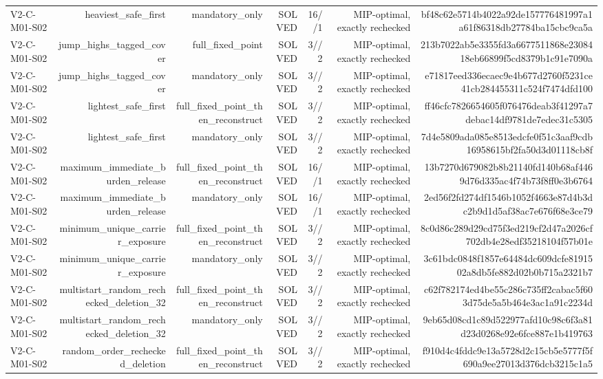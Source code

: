 {\begin{longtable}{lrrrrrr}
V2-C-M01-S02 & heaviest\_safe\_first & mandatory\_only & SOLVED & 16//1 & MIP-optimal, exactly rechecked & bf48c62e5714b4022a92de157776481997a1a61f86318db27784ba15cbc9ca5a \\
V2-C-M01-S02 & jump\_highs\_tagged\_cover & full\_fixed\_point & SOLVED & 3//2 & MIP-optimal, exactly rechecked & 213b7022ab5e3355fd3a6677511868e2308418eb66899f5cd8379b1c91e7090a \\
V2-C-M01-S02 & jump\_highs\_tagged\_cover & mandatory\_only & SOLVED & 3//2 & MIP-optimal, exactly rechecked & e71817eed336ecaec9e4b677d2760f5231ce41cb284455311c524f7474dfd100 \\
V2-C-M01-S02 & lightest\_safe\_first & full\_fixed\_point\_then\_reconstruct & SOLVED & 3//2 & MIP-optimal, exactly rechecked & ff46cfc7826654605f076476deab3f41297a7debac14df9781de7edec31c5305 \\
V2-C-M01-S02 & lightest\_safe\_first & mandatory\_only & SOLVED & 3//2 & MIP-optimal, exactly rechecked & 7d4e5809ada085e8513edcfe0f51c3aaf9cdb16958615bf2fa50d3d01118cb8f \\
V2-C-M01-S02 & maximum\_immediate\_burden\_release & full\_fixed\_point\_then\_reconstruct & SOLVED & 16//1 & MIP-optimal, exactly rechecked & 13b7270d679082b8b21140fd140b68af4469d76d335ac4f74b73f8ff0e3b6764 \\
V2-C-M01-S02 & maximum\_immediate\_burden\_release & mandatory\_only & SOLVED & 16//1 & MIP-optimal, exactly rechecked & 2ed56f2fd274df1546b1052f4663e87d4b3dc2b9d1d5af38ac7e676f68e3ce79 \\
V2-C-M01-S02 & minimum\_unique\_carrier\_exposure & full\_fixed\_point\_then\_reconstruct & SOLVED & 3//2 & MIP-optimal, exactly rechecked & 8c0d86c289d29cd75f3ed219cf2d47a2026cf702db4e28edf35218104f57b01e \\
V2-C-M01-S02 & minimum\_unique\_carrier\_exposure & mandatory\_only & SOLVED & 3//2 & MIP-optimal, exactly rechecked & 3c61bdc0848f1857e64484dc609dcfe8191502a8db5fe882d02b0b715a2321b7 \\
V2-C-M01-S02 & multistart\_random\_rechecked\_deletion\_32 & full\_fixed\_point\_then\_reconstruct & SOLVED & 3//2 & MIP-optimal, exactly rechecked & c62f782174ed4be55c286c735ff2cabac5f603d75de5a5b464e3ac1a91c2234d \\
V2-C-M01-S02 & multistart\_random\_rechecked\_deletion\_32 & mandatory\_only & SOLVED & 3//2 & MIP-optimal, exactly rechecked & 9eb65d08cd1c89d522977afd10c98c6f3a81d23d0268e92e6fce887e1b419763 \\
V2-C-M01-S02 & random\_order\_rechecked\_deletion & full\_fixed\_point\_then\_reconstruct & SOLVED & 3//2 & MIP-optimal, exactly rechecked & f910d4c4fddc9e13a5728d2c15cb5e5777f5f690a9ee27013d376dcb3215c1a5 \\

\end{longtable}}

